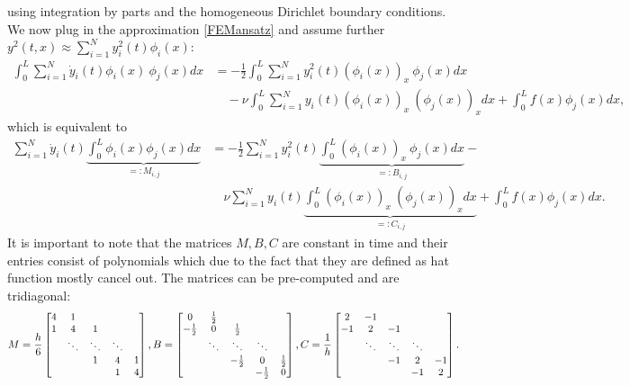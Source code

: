 using integration by parts and the homogeneous Dirichlet boundary conditions. We now plug in the approximation \eqref{FEMansatz} and assume further $y^2(t,x) \approx \sum_{i=1}^N y^2_i(t) \phi_i(x)$:
\begin{align*}
\int_0^L \sum_{i=1}^N \dot{y}_i(t) \phi_i(x) \ \phi_j(x) dx &= -\frac{1}{2} \int_0^L \sum_{i=1}^N y^2_i(t) (\phi_i(x))_x \ \phi_j(x) dx \\
&\quad - \nu \int_0^L \sum_{i=1}^N y_i(t) (\phi_i(x))_x \ (\phi_j(x))_x dx + \int_0^L f(x) \phi_j(x) dx ,
\end{align*}
which is equivalent to
\begin{align*}
 \sum_{i=1}^N \dot{y}_i(t) \underbrace{\int_0^L \phi_i(x) \phi_j(x) dx}_{=:M_{i,j}} &= -\frac{1}{2} \sum_{i=1}^N y^2_i(t) \underbrace{\int_0^L  (\phi_i(x))_x \ \phi_j(x) dx}_{=:B_{i,j}} - \\
 &\quad \nu \sum_{i=1}^N y_i(t) \underbrace{\int_0^L (\phi_i(x))_x \ (\phi_j(x))_x dx}_{=:C_{i,j}} + \int_0^L f(x) \phi_j(x) dx .
\end{align*}
It is important to note that the matrices $M,B,C$ are constant in time and their entries consist of polynomials which due to the fact that they are defined as hat function mostly cancel out. The matrices can be pre-computed and are tridiagonal:
\begin{align*}
M = \frac{h}{6} \small \begin{bmatrix} 4 & 1 & & & \\ 1 & 4 & 1 & & \\ & \ddots & \ddots & \ddots & \\ & & 1 & 4 & 1 \\ & & & 1 & 4\end{bmatrix}\normalsize, B = \small\begin{bmatrix} 0 & \frac{1}{2} & & & \\ -\frac{1}{2} & 0 & \frac{1}{2} & & \\ & \ddots & \ddots & \ddots & \\ & & -\frac{1}{2} & 0 & \frac{1}{2} \\ & & & -\frac{1}{2} & 0\end{bmatrix}\normalsize, C = \frac{1}{h} \small\begin{bmatrix} 2 & -1 & & & \\ -1 & 2 & -1 & & \\ & \ddots & \ddots & \ddots & \\ & & -1 & 2 & -1 \\ & & & -1 & 2\end{bmatrix}\normalsize.
\end{align*}

